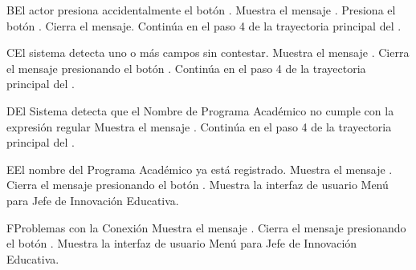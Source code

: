 \begin{UCtrayectoriaA}{B}{El actor presiona accidentalmente el botón .}
    \UCpaso Muestra el mensaje .
    \UCpaso[\UCactor] Presiona el botón .
    \UCpaso Cierra el mensaje.
    \UCpaso Continúa en el paso 4 de la trayectoria principal del .
\end{UCtrayectoriaA}
\begin{UCtrayectoriaA}{C}{El sistema detecta uno o más campos sin contestar.}
    \UCpaso Muestra el mensaje .
    \UCpaso[\UCactor] Cierra el mensaje presionando el botón .
    \UCpaso Continúa en el paso 4 de la trayectoria principal del .
\end{UCtrayectoriaA}
\begin{UCtrayectoriaA}{D}{El Sistema detecta que el Nombre de Programa Académico no cumple con la expresión regular}
    \UCpaso Muestra el mensaje .
    \UCpaso Continúa en el paso 4 de la trayectoria principal del .
\end{UCtrayectoriaA}

\begin{UCtrayectoriaA}{E}{El nombre del Programa Académico ya está registrado.}
    \UCpaso Muestra el mensaje .
    \UCpaso[\UCactor] Cierra el mensaje presionando el botón .
\UCpaso Muestra la interfaz de usuario Menú para Jefe de Innovación Educativa.
\end{UCtrayectoriaA}

\begin{UCtrayectoriaA}{F}{Problemas con la Conexión}
    \UCpaso Muestra el mensaje .
    \UCpaso[\UCactor] Cierra el mensaje presionando el botón .
\UCpaso Muestra la interfaz de usuario Menú para Jefe de Innovación Educativa.
\end{UCtrayectoriaA}

